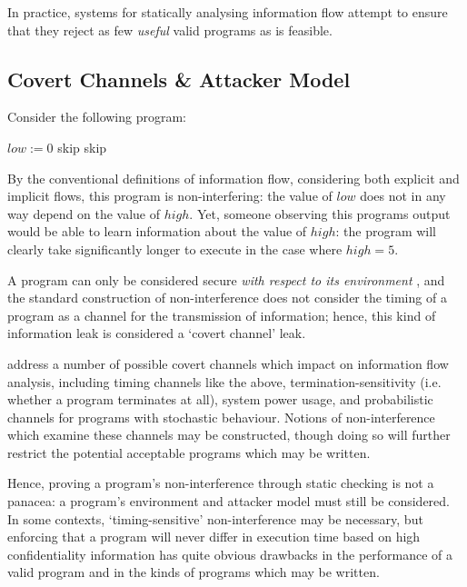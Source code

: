 In practice, systems for statically analysing information flow attempt to ensure that they reject as few \textit{useful} valid programs as is feasible.

\subsection{Covert Channels \& Attacker Model}

Consider the following program:

\begin{algorithmic}
	\State $ low := 0 $
			\State skip
		\EndFor
	\Else
		\State skip
	\EndIf
\end{algorithmic}

By the conventional definitions of information flow, considering both explicit and implicit flows, this program is non-interfering: the value of $ low $ does not in any way depend on the value of $ high $. Yet, someone observing this programs output would be able to learn information about the value of $ high $: the program will clearly take significantly longer to execute in the case where $ high = 5 $.

A program can only be considered secure \textit{with respect to its environment} \cite{sabelfeld2003if}, and the standard construction of non-interference does not consider the timing of a program as a channel for the transmission of information; hence, this kind of information leak is considered a `covert channel' leak.

\citeauthor{sabelfeld2003if} \cite{sabelfeld2003if} address a number of possible covert channels which impact on information flow analysis, including timing channels like the above, termination-sensitivity (i.e. whether a program terminates at all), system power usage, and probabilistic channels for programs with stochastic behaviour. Notions of non-interference which examine these channels may be constructed, though doing so will further restrict the potential acceptable programs which may be written.

Hence, proving a program's non-interference through static checking is not a panacea: a program's environment and attacker model must still be considered. In some contexts, `timing-sensitive' non-interference may be necessary, but enforcing that a program will never differ in execution time based on high confidentiality information has quite obvious drawbacks in the performance of a valid program and in the kinds of programs which may be written.


